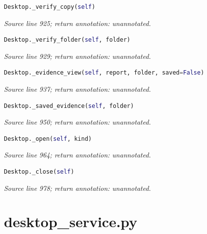 

\begin{lstlisting}[language=Python]
Desktop._verify_copy(self)
\end{lstlisting}


{\small \textit{Source line 925; return annotation: unannotated.}}



\begin{lstlisting}[language=Python]
Desktop._verify_folder(self, folder)
\end{lstlisting}


{\small \textit{Source line 929; return annotation: unannotated.}}



\begin{lstlisting}[language=Python]
Desktop._evidence_view(self, report, folder, saved=False)
\end{lstlisting}


{\small \textit{Source line 937; return annotation: unannotated.}}



\begin{lstlisting}[language=Python]
Desktop._saved_evidence(self, folder)
\end{lstlisting}


{\small \textit{Source line 950; return annotation: unannotated.}}



\begin{lstlisting}[language=Python]
Desktop._open(self, kind)
\end{lstlisting}


{\small \textit{Source line 964; return annotation: unannotated.}}



\begin{lstlisting}[language=Python]
Desktop._close(self)
\end{lstlisting}


{\small \textit{Source line 978; return annotation: unannotated.}}

\section{desktop\_service.py}


